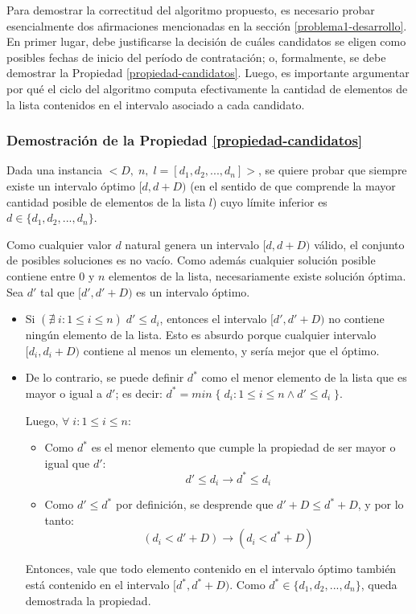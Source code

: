 Para demostrar la correctitud del algoritmo propuesto, es necesario probar esencialmente dos afirmaciones mencionadas en la sección \ref{problema1-desarrollo}. En primer lugar, debe justificarse la decisión de cuáles candidatos se eligen como posibles fechas de inicio del período de contratación; o, formalmente, se debe demostrar la Propiedad \ref{propiedad-candidatos}. Luego, es importante argumentar por qué el ciclo del algoritmo computa efectivamente la cantidad de elementos de la lista contenidos en el intervalo asociado a cada candidato.

\subsubsection{Demostración de la Propiedad \ref{propiedad-candidatos}}

Dada una instancia $<D,\;n,\;l = [d_1, d_2, ..., d_n]>$, se quiere probar que siempre existe un intervalo óptimo $[d, d + D)$ (en el sentido de que comprende la mayor cantidad posible de elementos de la lista $l$) cuyo límite inferior es $d \in \{d_1,d_2,...,d_n\}$.

Como cualquier valor $d$ natural genera un intervalo $[d, d + D)$ válido, el conjunto de posibles soluciones es no vacío. Como además cualquier solución posible contiene entre 0 y $n$ elementos de la lista, necesariamente existe solución óptima. Sea $d'$ tal que $[d', d' + D)$ es un intervalo óptimo.

\begin{itemize}
  \item Si $(\nexists\;i : 1 \leq i \leq n)\;d' \leq d_i$, entonces el intervalo $[d', d' + D)$ no contiene ningún elemento de la lista. Esto es absurdo porque cualquier intervalo $[d_i, d_i + D)$ contiene al menos un elemento, y sería mejor que el óptimo.
  \item De lo contrario, se puede definir $d^*$ como el menor elemento de la lista que es mayor o igual a $d'$; es decir: $d^* = min\;\{\;d_i : 1 \leq i \leq n \land d' \leq d_i\;\}$.

  Luego, $\forall\;i : 1 \leq i \leq n$:
  
  \begin{itemize}
    \item Como $d^*$ es el menor elemento que cumple la propiedad de ser mayor o igual que $d'$:
    $$d' \leq d_i \rightarrow d^*\leq d_i$$
    \item Como $d' \leq d^*$ por definición, se desprende que $d' + D \leq d^* + D$, y por lo tanto:
    $$(d_i < d' + D) \rightarrow (d_i < d^* + D)$$
  \end{itemize}
  Entonces, vale que todo elemento contenido en el intervalo óptimo también está contenido en el intervalo $[d^*, d^* + D)$. Como $d^* \in \{d_1,d_2,...,d_n\}$, queda demostrada la propiedad.
\end{itemize}

